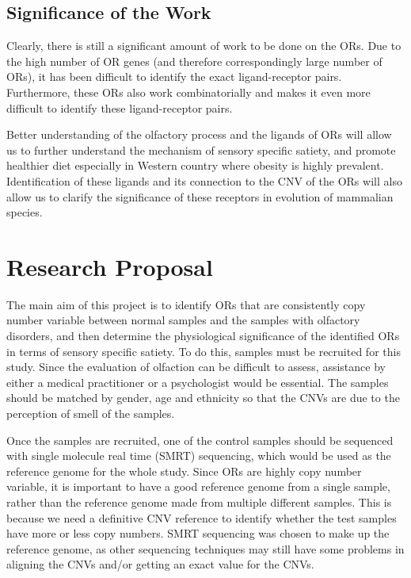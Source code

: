 \documentclass[a4paper, 12pt]{article}
\begin{document}
\subsection*{Significance of the Work}

Clearly, there is still a significant amount of work to be done on the ORs.
Due to the high number of OR genes (and therefore correspondingly large number of ORs), it has been difficult to identify the exact ligand-receptor pairs.
Furthermore, these ORs also work combinatorially and makes it even more difficult to identify these ligand-receptor pairs.

Better understanding of the olfactory process and the ligands of ORs will allow us to further understand the mechanism of sensory specific satiety, and promote healthier diet especially in Western country where obesity is highly prevalent.
Identification of these ligands and its connection to the CNV of the ORs will also allow us to clarify the significance of these receptors in evolution of mammalian species.

\section*{Research Proposal}

The main aim of this project is to identify ORs that are consistently copy number variable between normal samples and the samples with olfactory disorders, and then determine the physiological significance of the identified ORs in terms of sensory specific satiety.
To do this, samples must be recruited for this study.
Since the evaluation of olfaction can be difficult to assess, assistance by either a medical practitioner or a psychologist would be essential.
The samples should be matched by gender, age and ethnicity so that the CNVs are due to the perception of smell of the samples.

Once the samples are recruited, one of the control samples should be sequenced with single molecule real time (SMRT) sequencing, which would be used as the reference genome for the whole study.
Since ORs are highly copy number variable, it is important to have a good reference genome from a single sample, rather than the reference genome made from multiple different samples.
This is because we need a definitive CNV reference to identify whether the test samples have more or less copy numbers.
SMRT sequencing was chosen to make up the reference genome, as other sequencing techniques may still have some problems in aligning the CNVs and/or getting an exact value for the CNVs.
\end{document}
